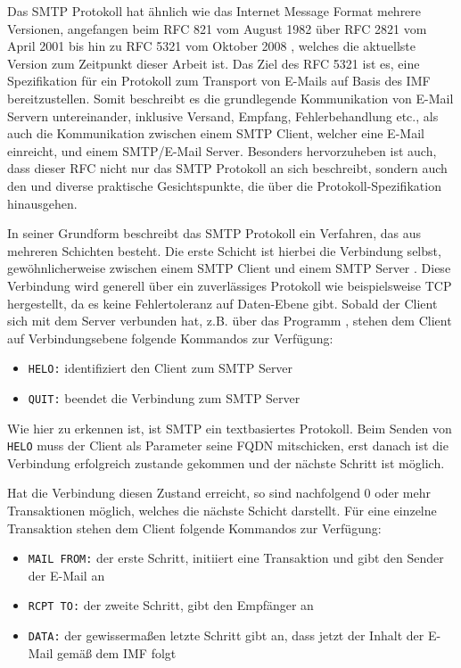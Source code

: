 Das SMTP Protokoll hat ähnlich wie das Internet Message Format mehrere Versionen, angefangen beim RFC 821 vom August 1982 
über RFC 2821 vom April 2001 
bis hin zu RFC 5321 vom Oktober 2008 ,
welches die aktuellste Version zum Zeitpunkt dieser Arbeit ist. Das Ziel des RFC 5321 ist es, eine Spezifikation für ein Protokoll zum Transport von E-Mails auf Basis des IMF bereitzustellen. Somit beschreibt es die grundlegende Kommunikation von E-Mail Servern untereinander, inklusive Versand, Empfang, Fehlerbehandlung etc., als auch die Kommunikation zwischen einem SMTP Client, welcher eine E-Mail einreicht, und einem SMTP/E-Mail Server. Besonders hervorzuheben ist auch, dass dieser RFC nicht nur das SMTP Protokoll an sich beschreibt, sondern auch den 
und diverse praktische Gesichtspunkte, die über die Protokoll-Spezifikation hinausgehen.

In seiner Grundform beschreibt das SMTP Protokoll ein Verfahren, das aus mehreren Schichten besteht. Die erste Schicht ist hierbei die Verbindung selbst, gewöhnlicherweise zwischen einem SMTP Client und einem SMTP Server . Diese Verbindung wird generell über ein zuverlässiges Protokoll wie beispielsweise TCP hergestellt, da es keine Fehlertoleranz auf Daten-Ebene gibt. Sobald der Client sich mit dem Server verbunden hat, z.B. über das Programm , stehen dem Client auf Verbindungsebene folgende Kommandos zur Verfügung:
\begin{itemize}
\item \verb#HELO:# identifiziert den Client zum SMTP Server
\item \verb#QUIT:# beendet die Verbindung zum SMTP Server
\end{itemize}


Wie hier zu erkennen ist, ist SMTP ein textbasiertes Protokoll. Beim Senden von \verb#HELO# muss der Client als Parameter seine FQDN mitschicken, erst danach ist die Verbindung erfolgreich zustande gekommen und der nächste Schritt ist möglich.

Hat die Verbindung diesen Zustand erreicht, so sind nachfolgend 0 oder mehr Transaktionen möglich, welches die nächste Schicht darstellt. Für eine einzelne Transaktion stehen dem Client folgende Kommandos zur Verfügung:
\begin{itemize}
\item \verb#MAIL FROM:# der erste Schritt, initiiert eine Transaktion und gibt den Sender der E-Mail an
\item \verb#RCPT TO:# der zweite Schritt, gibt den Empfänger an
\item \verb#DATA:# der gewissermaßen letzte Schritt gibt an, dass jetzt der Inhalt der E-Mail gemäß dem IMF folgt
\end{itemize}

